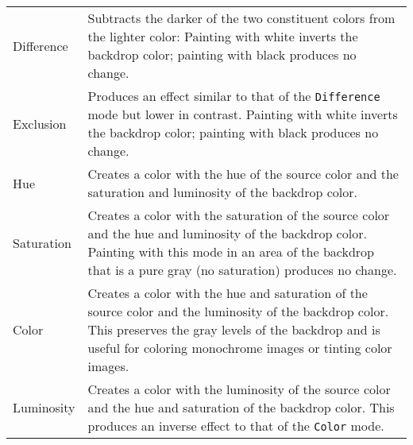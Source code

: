 \documentclass{article}
\begin{document}
\begin{longtable}{>{\ttfamily}lp{3.5in}}
Difference &Subtracts the darker of the two constituent colors from
            the lighter color: Painting with white inverts the backdrop color;
            painting with black produces no change.
\\[3pt]

Exclusion & Produces an effect similar to that of the \texttt{Difference}
            mode but lower in contrast. Painting with white inverts the backdrop
            color; painting with black produces no change.
\\[3pt]
Hue & Creates a color with the hue of the source color and the
            saturation and luminosity of the backdrop color.
\\[3pt]

Saturation & Creates a color with the saturation of the source color
            and the hue and luminosity of the backdrop color. Painting with this
            mode in an area of the backdrop that is a pure gray (no saturation)
            produces no change.
\\[3pt]

Color & Creates a color with the hue and saturation of the source
            color and the luminosity of the backdrop color. This preserves the
            gray levels of the backdrop and is useful for coloring monochrome
            images or tinting color images.
\\[3pt]
Luminosity & Creates a color with the luminosity of the source color
            and the hue and saturation of the backdrop color. This produces an
            inverse effect to that of the \texttt{Color} mode.
\\[3pt]
\end{longtable}
\end{document}
